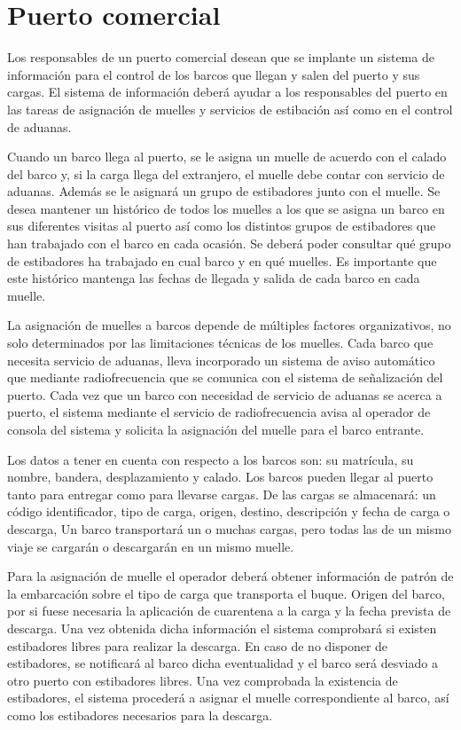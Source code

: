 \documentclass{db-practice}
\begin{document}
\section{Puerto comercial}
Los responsables de un puerto comercial desean que se implante un sistema de información para el control de los barcos que llegan y salen del puerto y sus cargas. El sistema de información deberá ayudar a los responsables del puerto en las tareas de asignación de muelles y servicios de estibación así como en el control de aduanas.

Cuando un barco llega al puerto, se le asigna un muelle de acuerdo con el calado del barco y, si la carga llega del extranjero, el muelle debe contar con servicio de aduanas. Además se le asignará un grupo de estibadores junto con el muelle. Se desea mantener un histórico de todos los muelles a los que se asigna un barco en sus diferentes visitas al puerto así como los distintos grupos de estibadores que han trabajado con el barco en cada ocasión. Se deberá poder consultar qué grupo de estibadores ha trabajado en cual barco y en qué muelles. Es importante que este histórico mantenga las fechas de llegada y salida de cada barco en cada muelle.

La asignación de muelles a barcos depende de múltiples factores organizativos, no solo determinados por las limitaciones técnicas de los muelles. Cada barco que necesita servicio de aduanas, lleva incorporado un sistema de aviso automático que mediante radiofrecuencia que se comunica con el sistema de señalización del puerto. Cada vez que un barco con necesidad de servicio de aduanas se acerca a puerto, el sistema mediante el servicio de radiofrecuencia avisa al operador de consola del sistema y solicita la asignación del muelle para el barco entrante.

Los datos a tener en cuenta con respecto a los barcos son: su matrícula, su nombre, bandera, desplazamiento y calado. Los barcos pueden llegar al puerto tanto para entregar como para llevarse cargas. De las cargas se almacenará: un código identificador, tipo de carga, origen, destino, descripción y fecha de carga o descarga, Un barco transportará un o muchas cargas, pero todas las de un mismo viaje se cargarán o descargarán en un mismo muelle.

Para la asignación de muelle el operador deberá obtener información de patrón de la embarcación sobre el tipo de carga que transporta el buque. Origen del barco, por si fuese necesaria la aplicación de cuarentena a la carga y la fecha prevista de descarga. Una vez obtenida dicha información el sistema comprobará si existen estibadores libres para realizar la descarga. En caso de no disponer de estibadores, se notificará al barco dicha eventualidad y el barco será desviado a otro puerto con estibadores libres. Una vez comprobada la existencia de estibadores, el sistema procederá a asignar el muelle correspondiente al barco, así como los estibadores necesarios para la descarga.
\end{document}
